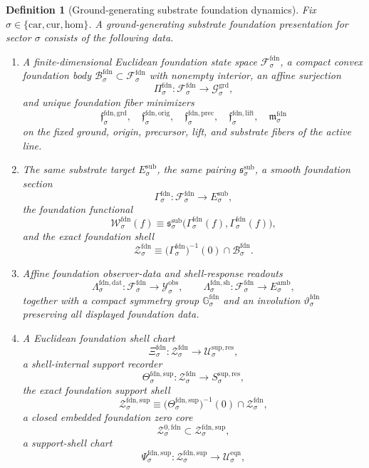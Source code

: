 \documentclass[11pt]{article}
\newcommand{\Car}{\mathrm{car}}
\newcommand{\Cur}{\mathrm{cur}}
\newcommand{\Hom}{\mathrm{hom}}
\newcommand{\DataSpace}[1]{\mathcal Y_{#1}^{\mathrm{obs}}}
\newcommand{\AmbientTarget}[1]{E_{#1}^{\mathrm{amb}}}
\newcommand{\SubTarget}[1]{E_{#1}^{\mathrm{sub}}}
\newcommand{\SubPair}[1]{\mathfrak s_{#1}^{\mathrm{sub}}}
\newcommand{\GroundSpace}[1]{\mathcal G_{#1}^{\mathrm{grd}}}
\newcommand{\FoundSpace}[1]{\mathcal F_{#1}^{\mathrm{fdn}}}
\newcommand{\FoundBody}[1]{\mathcal B_{#1}^{\mathrm{fdn}}}
\newcommand{\FoundProj}[1]{\Pi_{#1}^{\mathrm{fdn}}}
\newcommand{\FoundGroundMin}[1]{\mathfrak f_{#1}^{\mathrm{fdn,grd}}}
\newcommand{\FoundOrigMin}[1]{\mathfrak f_{#1}^{\mathrm{fdn,orig}}}
\newcommand{\FoundPrecMin}[1]{\mathfrak f_{#1}^{\mathrm{fdn,prec}}}
\newcommand{\FoundLiftMin}[1]{\mathfrak f_{#1}^{\mathrm{fdn,lift}}}
\newcommand{\FoundSubMin}[1]{\mathfrak m_{#1}^{\mathrm{fdn}}}
\newcommand{\FoundSection}[1]{\Gamma_{#1}^{\mathrm{fdn}}}
\newcommand{\FoundFunctional}[1]{\mathscr W_{#1}^{\mathrm{fdn}}}
\newcommand{\FoundData}[1]{\Lambda_{#1}^{\mathrm{fdn,dat}}}
\newcommand{\FoundShellMap}[1]{\Lambda_{#1}^{\mathrm{fdn,sh}}}
\newcommand{\FoundShellSet}[1]{\mathcal Z_{#1}^{\mathrm{fdn}}}
\newcommand{\FoundSym}[1]{\mathbb G_{#1}^{\mathrm{fdn}}}
\newcommand{\FoundTime}[1]{\vartheta_{#1}^{\mathrm{fdn}}}
\newcommand{\FoundChart}[1]{\Xi_{#1}^{\mathrm{fdn}}}
\newcommand{\FoundSupport}[1]{\Theta_{#1}^{\mathrm{fdn,sup}}}
\newcommand{\FoundSupportShell}[1]{\mathcal Z_{#1}^{\mathrm{fdn,sup}}}
\newcommand{\FoundZeroCore}[1]{\mathcal Z_{#1}^{0,\mathrm{fdn}}}
\newcommand{\FoundEqChart}[1]{\Psi_{#1}^{\mathrm{fdn,sup}}}
\newcommand{\ResSpace}[1]{\mathcal U_{#1}^{\mathrm{sup,res}}}
\newcommand{\ResTarget}[1]{S_{#1}^{\mathrm{sup,res}}}
\newcommand{\EqnSpace}[1]{\mathcal U_{#1}^{\mathrm{eqn}}}
\newtheorem{definition}{Definition}
\begin{document}
\begin{definition}[Ground-generating substrate foundation dynamics]
\label{def:foundation}
Fix \(\sigma\in\{\Car,\Cur,\Hom\}\). A ground-generating substrate foundation presentation for sector \(\sigma\) consists of the following data.
\begin{enumerate}
    \item A finite-dimensional Euclidean foundation state space \(\FoundSpace{\sigma}\), a compact convex foundation body \(\FoundBody{\sigma}\subset\FoundSpace{\sigma}\) with nonempty interior, an affine surjection
    \[
    \FoundProj{\sigma}:\FoundSpace{\sigma}\to\GroundSpace{\sigma},
    \]
    and unique foundation fiber minimizers
    \[
    \FoundGroundMin{\sigma},\quad
    \FoundOrigMin{\sigma},\quad
    \FoundPrecMin{\sigma},\quad
    \FoundLiftMin{\sigma},\quad
    \FoundSubMin{\sigma}
    \]
    on the fixed ground, origin, precursor, lift, and substrate fibers of the active line.
    \item The same substrate target \(\SubTarget{\sigma}\), the same pairing \(\SubPair{\sigma}\), a smooth foundation section
    \[
    \FoundSection{\sigma}:\FoundSpace{\sigma}\to\SubTarget{\sigma},
    \]
    the foundation functional
    \[
    \FoundFunctional{\sigma}(f)
    \equiv
    \SubPair{\sigma}\bigl(\FoundSection{\sigma}(f),\FoundSection{\sigma}(f)\bigr),
    \]
    and the exact foundation shell
    \[
    \FoundShellSet{\sigma}
    \equiv
    \bigl(\FoundSection{\sigma}\bigr)^{-1}(0)\cap\FoundBody{\sigma}.
    \]
    \item Affine foundation observer-data and shell-response readouts
    \[
    \FoundData{\sigma}:\FoundSpace{\sigma}\to\DataSpace{\sigma},
    \qquad
    \FoundShellMap{\sigma}:\FoundSpace{\sigma}\to\AmbientTarget{\sigma},
    \]
    together with a compact symmetry group \(\FoundSym{\sigma}\) and an involution \(\FoundTime{\sigma}\) preserving all displayed foundation data.
    \item A Euclidean foundation shell chart
    \[
    \FoundChart{\sigma}:\FoundShellSet{\sigma}\to\ResSpace{\sigma},
    \]
    a shell-internal support recorder
    \[
    \FoundSupport{\sigma}:\FoundShellSet{\sigma}\to\ResTarget{\sigma},
    \]
    the exact foundation support shell
    \[
    \FoundSupportShell{\sigma}
    \equiv
    \bigl(\FoundSupport{\sigma}\bigr)^{-1}(0)\cap\FoundShellSet{\sigma},
    \]
    a closed embedded foundation zero core
    \[
    \FoundZeroCore{\sigma}\subset\FoundSupportShell{\sigma},
    \]
    a support-shell chart
    \[
    \FoundEqChart{\sigma}:\FoundSupportShell{\sigma}\to\EqnSpace{\sigma},
\]
\end{enumerate}
\end{definition}
\end{document}
